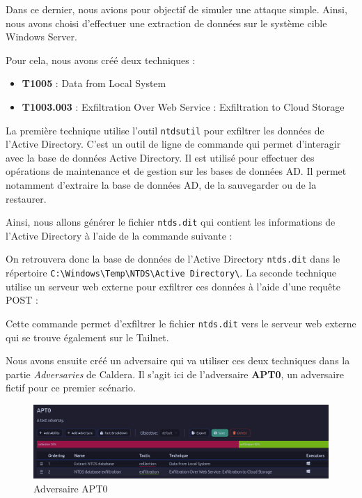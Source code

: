 \documentclass[12pt,letterpaper]{article}
\begin{document}
Dans ce dernier, nous avions pour objectif de simuler une attaque simple.
Ainsi, nous avons choisi d'effectuer une extraction de données sur le système cible Windows Server.

Pour cela, nous avons créé deux techniques :
\begin{itemize}
    \item \textbf{T1005} : Data from Local System
    \item \textbf{T1003.003} : Exfiltration Over Web Service : Exfiltration to Cloud Storage
\end{itemize}

La première technique utilise l'outil \verb|ntdsutil| pour exfiltrer les données de l'Active Directory.
C'est un outil de ligne de commande qui permet d'interagir avec la base de données Active Directory.
Il est utilisé pour effectuer des opérations de maintenance et de gestion sur les bases de données AD.
Il permet notamment d'extraire la base de données AD, de la sauvegarder ou de la restaurer.

Ainsi, nous allons générer le fichier \verb|ntds.dit| qui contient les informations de l'Active Directory à l'aide de la commande suivante :


On retrouvera donc la base de données de l'Active Directory \verb|ntds.dit| dans le répertoire \verb|C:\Windows\Temp\NTDS\Active Directory\|.
La seconde technique utilise un serveur web externe pour exfiltrer ces données à l'aide d'une requête POST :

Cette commande permet d'exfiltrer le fichier \verb|ntds.dit| vers le serveur web externe qui se trouve également sur le Tailnet.

\newpage

Nous avons ensuite créé un adversaire qui va utiliser ces deux techniques dans la partie \textit{Adversaries} de Caldera.
Il s'agit ici de l'adversaire \textbf{APT0}, un adversaire fictif pour ce premier scénario.

\begin{figure}[h!]
    \centering
    \includegraphics[width=1\textwidth]{images/caldera/apt0_adversary.png}
    \caption{Adversaire APT0}
    \label{fig:apt0_adversary}
\end{figure}
\end{document}
